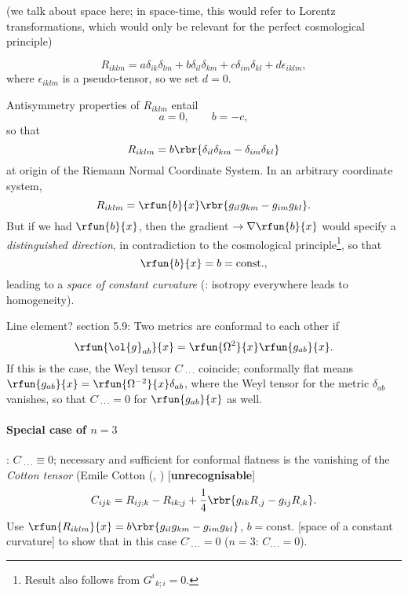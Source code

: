(we talk about space here; in space-time, this would refer to Lorentz 
transformations, which would only be relevant for the perfect cosmological 
principle)

\begin{equation}
R_{iklm} = a\delta_{ik}\delta_{lm} + b\delta_{il}\delta_{km} + c\delta_{im} 
\delta_{kl} + d\epsilon_{iklm},
\end{equation}
where $\epsilon_{iklm}$ is a pseudo-tensor, so we set $d=0$.

Antisymmetry properties of $R_{iklm}$ entail
\begin{equation}
a = 0, \qquad b = -c,
\end{equation}
so that
\begin{equation}
R_{iklm} = b\rbr{\delta_{il}\delta_{km} - \delta_{im}\delta_{kl}}
\end{equation}
at origin of the Riemann Normal Coordinate System. In an arbitrary coordinate 
system,
\begin{equation}
R_{iklm} = \rfun{b}{x}\rbr{g_{il}g_{km} - g_{im}g_{kl}}.
\end{equation}
But if we had $\rfun{b}{x}$, then the gradient $\rightarrow{\nabla}\rfun{b}{x}$ 
would specify a \emph{distinguished direction}, in contradiction to the 
cosmological principle\footnote{Result also follows from $G^i{}_{k;i}=0$.}, so 
that
\begin{equation}
\rfun{b}{x} = b = \text{const.},
\end{equation}
leading to a \emph{space of constant curvature} (\cite{Schur1886}: 
isotropy everywhere leads to homogeneity).

Line element?
section 5.9: Two metrics are conformal to each other if
\begin{equation}
\rfun{\ol{g}_{ab}}{x} = \rfun{\Omega^2}{x}\rfun{g_{ab}}{x}.
\end{equation}
If this is the case, the Weyl tensor $C^\cdot{}_{\cdot\cdot\cdot}$ coincide; 
conformally flat means $\rfun{g_{ab}}{x} = \rfun{\Omega^{-2}}{x}\delta_{ab}$, 
where the Weyl tensor for the metric $\delta_{ab}$ vanishes, so that 
$C^\cdot{}_{\cdot\cdot\cdot} = 0$ for $\rfun{g_{ab}}{x}$ as well.

\paragraph{Special case of $n=3$}: $C^\cdot{}_{\cdot\cdot\cdot} \equiv 0$; 
necessary and sufficient for conformal flatness is the vanishing of the 
\emph{Cotton tensor} (Emile Cotton (, ) 
[\textbf{unrecognisable}]
\begin{equation}
C_{ijk} = R_{ij;k} - R_{ik;j} + \frac{1}{4}\rbr{g_{ik}R_{,j} - g_{ij}R_{,k}}.
\end{equation}
Use $\rfun{R_{iklm}}{x} = b\rbr{g_{il}g_{km} - g_{im}g_{kl}}$, $b = 
\text{const.}$ [space of a constant curvature] to show that in this case 
$C^\cdot{}_{\cdot\cdot\cdot} = 0$ ($n=3$: $C_{\cdot\cdot\cdot} = 0$).


